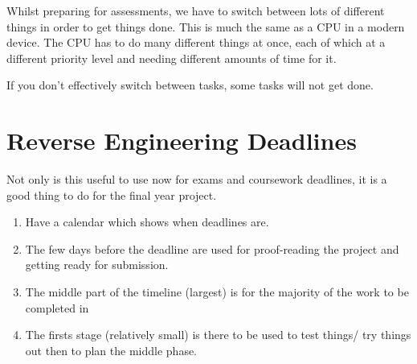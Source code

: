 Whilst preparing for assessments, we have to switch between lots of different things in order to get things done. This is much the same as a CPU in a modern device. The CPU has to do many different things at once, each of which at a different priority level and needing different amounts of time for it. 

If you don't effectively switch between tasks, some tasks will not get done. 

\section*{Reverse Engineering Deadlines}
Not only is this useful to use now for exams and coursework deadlines, it is a good thing to do for the final year project.
\begin{enumerate}
    \item Have a calendar which shows when deadlines are.
    \item The few days before the deadline are used for proof-reading the project and getting ready for submission.
    \item The middle part of the timeline (largest) is for the majority of the work to be completed in
    \item The firsts stage (relatively small) is there to be used to test things/ try things out then to plan the middle phase.
\end{enumerate}

